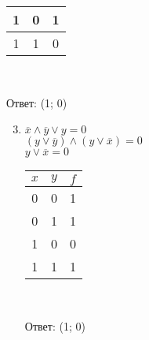 \begin{spacing}{1.5}
\begin{minipage}[t]{0.3\textwidth}
\begin{enumerate}
\begin{spacing}{1}
\begin{tabular}{|c|c|c|}
                        \hline
                        1   & 0   & 1   \\
                        \hline
                        1   & 1   & 0   \\
                        \hline
                    \end{tabular}\\
                \end{spacing}
                Ответ: (1; 0)
            \end{enumerate}
        \end{minipage}
        \begin{minipage}[t]{0.3\textwidth}
            \begin{enumerate}
                \setcounter{enumi}{2}
                \item $\overline x \wedge \overline y \vee y = 0$\\
                $(y \vee \overline y) \wedge (y \vee \overline x) = 0$\\
                $y \vee \overline x = 0$\\
                \begin{spacing}{1}
                    \begin{tabular}{|c|c|c|}
                        \hline
                        $x$ & $y$ & $f$ \\
                        \hline
                        0   & 0   & 1   \\
                        \hline
                        0   & 1   & 1   \\
                        \hline
                        1   & 0   & 0   \\
                        \hline
                        1   & 1   & 1   \\
                        \hline
                    \end{tabular}\\
                \end{spacing}
                Ответ: (1; 0)
            \end{enumerate}
        \end{minipage}

        \begin{center}\end{center}


\end{spacing}
